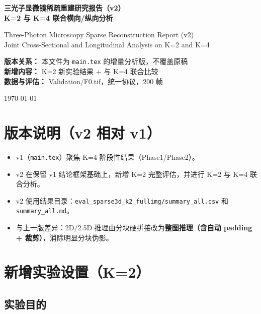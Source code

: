 \documentclass[UTF8, scheme=plain, 11pt, a4paper]{ctexart}
\begin{document}
\begin{titlepage}
  \centering
  \vspace*{2cm}
  {\LARGE\bfseries 三光子显微镜稀疏重建研究报告（v2）\\[0.5em]
   K=2 与 K=4 联合横向/纵向分析\par}
  \vspace{1em}
  {\large Three-Photon Microscopy Sparse Reconstruction Report (v2)\\
   Joint Cross-Sectional and Longitudinal Analysis on K=2 and K=4\par}
  \vspace{2em}
  {\normalsize
   \textbf{版本关系：} 本文件为 \texttt{main.tex} 的增量分析版，不覆盖原稿\\[0.5em]
   \textbf{新增内容：} K=2 新实验结果 + 与 K=4 联合比较\\[0.5em]
   \textbf{数据与评估：} Validation/F0.tif，统一协议，200 帧\par}
  \vspace{1.5em}
  {\small \today}
  \vfill
\end{titlepage}

\tableofcontents
\newpage

\section{版本说明（v2 相对 v1）}

\begin{itemize}
  \item v1（\texttt{main.tex}）聚焦 K=4 阶段性结果（Phase1/Phase2）。
  \item v2 在保留 v1 结论框架基础上，新增 K=2 完整评估，并进行 K=2 与 K=4 联合分析。
  \item v2 使用结果目录：\texttt{eval\_sparse3d\_k2\_fullimg/summary\_all.csv} 和 \texttt{summary\_all.md}。
  \item 与上一版差异：2D/2.5D 推理由分块硬拼接改为\textbf{整图推理（含自动 padding + 裁剪）}，消除明显分块伪影。
\end{itemize}

\section{新增实验设置（K=2）}

\subsection{实验目的}
\end{document}
